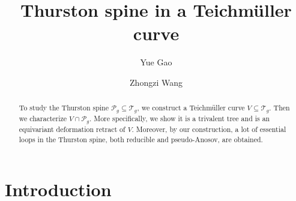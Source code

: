 \documentclass[UTF8]{amsart}
\numberwithin{equation}{section}
\theoremstyle{definition}
\theoremstyle{example}
\theoremstyle{remark}
\begin{document}

\title{Thurston spine in a Teichm\"uller curve}
\author{Yue Gao}
\address{School of Mathematics and Statistics, Anhui Normal University, Wuhu, Anhui, China}

\author{Zhongzi Wang}
\address{School of Mathematical Sciences, Peking University, Beijing, China}

\date{}

\maketitle

\begin{abstract}
 To study the Thurston spine $\mathcal{P}_g \subseteq \mathcal{T}_g$, we construct a Teichm\"uller curve $V \subseteq \mathcal{T}_g$. Then we characterize $V \cap \mathcal{P}_g$. More specifically, we show it is a trivalent tree and is an equivariant deformation retract of $V$. 
 Moreover, by our construction, a lot of essential loops in the Thurston spine, both reducible and pseudo-Anosov, are obtained. 
\end{abstract}

\tableofcontents


\section{Introduction}
\end{document}
